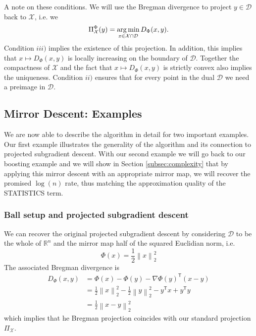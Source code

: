 A note on these conditions. We will use the Bregman divergence to project $y \in \mathcal{D}$ back to $\mathcal{X}$, i.e. we 
\begin{equation*}
	\Pi_\mathcal{X}^\Phi(y) = \operatorname*{arg\,min}_{x\in \mathcal{X}\cap\mathcal{D}} D_\Phi(x, y).
\end{equation*}
Condition $iii)$ implies the existence of this projection. In addition, this implies that $x\mapsto D_\Phi(x, y)$ is locally increasing on the boundary of $\mathcal{D}$. Together the compactness of $\mathcal{X}$ and the fact that $x\mapsto D_\Phi(x, y)$ is strictly convex also implies the uniqueness. 
Condition $ii)$ ensures that for every point in the dual $\mathcal{D}$ we need a preimage in $\mathcal{D}$.



\subsection{Mirror Descent: Examples}

We are now able to describe the algorithm in detail for two important examples. Our first example illustrates the generality of the algorithm and its connection to projected subgradient descent. With our second example we will go back to our boosting example and we will show in Section \ref{subsec:complexity} that by applying this mirror descent with an appropriate mirror map, we will recover the promised $\log(n)$ rate, thus matching the approximation quality of the STATISTICS term.

\subsubsection{Ball setup and projected subgradient descent}
We can recover the original projected subgradient descent by considering $\mathcal{D}$ to be the whole of $\mathbb{R}^n$ and the mirror map half of the squared Euclidian norm, i.e. 
\begin{equation*}
	\Phi(x) = \frac{1}{2}\left\|x\right\|_2^2
\end{equation*}
The associated Bregman divergence is 
\begin{align*}
	D_\Phi(x, y) &= \Phi(x) - \Phi(y) - \nabla \Phi(y)^\mathsf{T}(x - y) \\
	& = \frac{1}{2}\left\|x\right\|_2^2 - \frac{1}{2}\left\|y\right\|_2^2 - y^\mathsf{T}x + y^\mathsf{T}y \\
	& = \frac{1}{2}\left\|x - y\right\|_2^2
\end{align*}
which implies that he Bregman projection coincides with our standard projection $\Pi_\mathcal{X}$.

